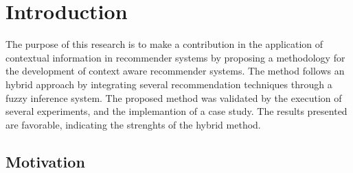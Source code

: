 \chapter{Introduction} \label{introduction} 

The purpose of this research is to make a contribution in the
application of contextual information in recommender systems by
proposing a methodology for the development of context aware
recommender systems. The method follows an hybrid  approach by
integrating several recommendation techniques through a fuzzy
inference system. The proposed method was validated by the
execution of several experiments, and the implemantion of a case
study. The results presented are favorable, indicating the
strenghts of the hybrid method.

\section{Motivation}

